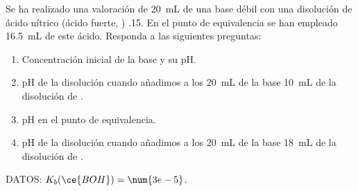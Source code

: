 Se ha realizado una valoración de \SI{20}{\milli\liter} de una base débil  con una disolución de ácido nítrico (ácido fuerte, ) \SI{,15}{\Molar}. En el punto de equivalencia se han empleado \SI{16,5}{\milli\liter} de este ácido. Responda a las siguientes preguntas:
\begin{enumerate}[label={\alph*)},font={\color{red!50!black}\bfseries}]
	\item Concentración inicial de la base y su pH.
	\item pH de la disolución cuando añadimos a los \SI{20}{\milli\liter} de la base \SI{10}{\milli\liter} de la disolución de .
	\item pH en el punto de equivalencia.
	\item pH de la disolución cuando añadimos a los \SI{20}{\milli\liter} de la base \SI{18}{\milli\liter} de la disolución de .
\end{enumerate}
DATOS: $K_b(\ce{BOH}) = \num{3e-5}$.
